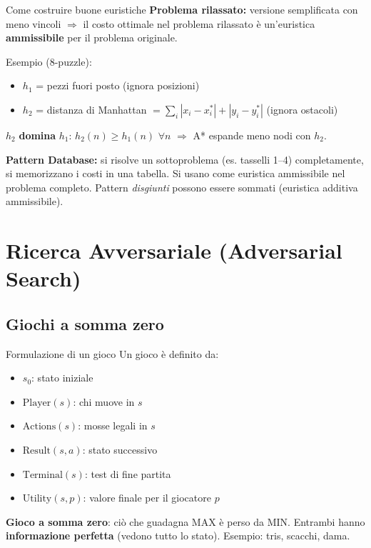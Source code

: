 \documentclass[12pt,a4paper]{article}
\begin{document}
\begin{formulabox}{Come costruire buone euristiche}
\textbf{Problema rilassato:} versione semplificata con meno vincoli $\Rightarrow$ il costo ottimale nel problema rilassato è un'euristica \textbf{ammissibile} per il problema originale.

Esempio (8-puzzle):
\begin{itemize}[noitemsep]
  \item $h_1$ = pezzi fuori posto (ignora posizioni)
  \item $h_2$ = distanza di Manhattan $= \sum_i |x_i - x_i^*| + |y_i - y_i^*|$ (ignora ostacoli)
\end{itemize}
$h_2$ \textbf{domina} $h_1$: $h_2(n) \geq h_1(n)$ $\forall n$ $\Rightarrow$ A* espande meno nodi con $h_2$.

\textbf{Pattern Database:} si risolve un sottoproblema (es. tasselli 1--4) completamente, si memorizzano i costi in una tabella. Si usano come euristica ammissibile nel problema completo. Pattern \emph{disgiunti} possono essere sommati (euristica additiva ammissibile).
\end{formulabox}

\section{Ricerca Avversariale (Adversarial Search)}

\subsection{Giochi a somma zero}

\begin{defbox}{Formulazione di un gioco}
Un gioco è definito da:
\begin{itemize}[noitemsep]
  \item $s_0$: stato iniziale
  \item $\text{Player}(s)$: chi muove in $s$
  \item $\text{Actions}(s)$: mosse legali in $s$
  \item $\text{Result}(s, a)$: stato successivo
  \item $\text{Terminal}(s)$: test di fine partita
  \item $\text{Utility}(s, p)$: valore finale per il giocatore $p$
\end{itemize}
\textbf{Gioco a somma zero}: ciò che guadagna MAX è perso da MIN. Entrambi hanno \textbf{informazione perfetta} (vedono tutto lo stato). Esempio: tris, scacchi, dama.
\end{defbox}
\end{document}
